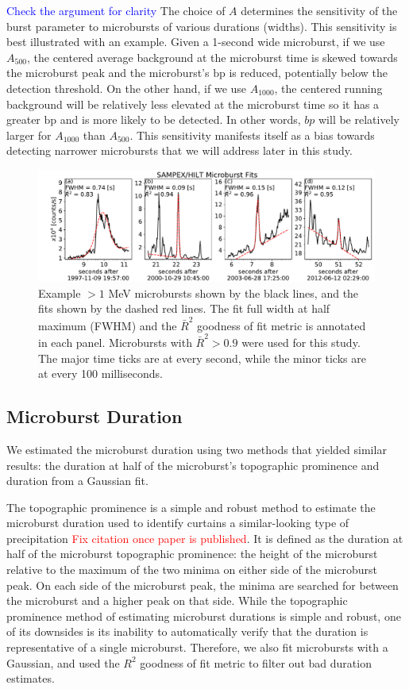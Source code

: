 \documentclass[draft]{agujournal2019}
\begin{document}
\textcolor{blue}{Check the argument for clarity} The choice of $A$ determines the sensitivity of the burst parameter to microbursts of various durations (widths). This sensitivity is best illustrated with an example. Given a 1-second wide microburst, if we use $A_{500}$, the centered average background at the microburst time is skewed towards the microburst peak and the microburst's $\mathrm{bp}$ is reduced, potentially below the detection threshold. On the other hand, if we use $A_{1000}$, the centered running background will be relatively less elevated at the microburst time so it has a greater $\mathrm{bp}$ and is more likely to be detected. In other words, $bp$ will be relatively larger for $A_{1000}$ than $A_{500}$. This sensitivity manifests itself as a bias towards detecting narrower microbursts that we will address later in this study. 

\begin{figure}
\noindent\includegraphics[width=\textwidth]{figures/fig1.pdf}
\caption{Example $>1$ MeV microbursts shown by the black lines, and the fits shown by the dashed red lines. The fit full width at half maximum (FWHM) and the $\bar{R}^2$ goodness of fit metric is annotated in each panel. Microbursts with $\bar{R}^2 > 0.9$ were used for this study. The major time ticks are at every second, while the minor ticks are at every 100 milliseconds.}
\label{fig1}
\end{figure}

\subsection{Microburst Duration}
We estimated the microburst duration using two methods that yielded similar results: the duration at half of the microburst's topographic prominence and duration from a Gaussian fit.

The topographic prominence is a simple and robust method to estimate the microburst duration used to identify curtains a similar-looking type of precipitation \cite{Shumko2020b} \textcolor{red}{Fix citation once paper is published}. It is defined as the duration at half of the microburst topographic prominence: the height of the microburst relative to the maximum of the two minima on either side of the microburst peak. On each side of the microburst peak, the minima are searched for between the microburst and a higher peak on that side. While the topographic prominence method of estimating microburst durations is simple and robust, one of its downsides is its inability to automatically verify that the duration is representative of a single microburst. Therefore, we also fit microbursts with a Gaussian, and used the $R^2$ goodness of fit metric to filter out bad duration estimates.
\end{document}
